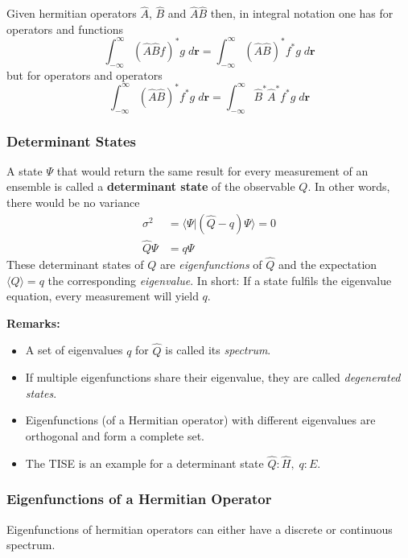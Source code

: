 Given hermitian operators $\hat{A}$, $\hat{B}$ and $\hat{A}\hat{B}$ then, in integral notation one has for operators and functions
\begin{equation*}
    \int_{-\infty}^{\infty} {(\hat{A}\hat{B}f)}^* g\; d \mathbf{r}=\int_{-\infty}^{\infty} {(\hat{A}\hat{B})}^*f^* g\; d \mathbf{r}
\end{equation*}
but for operators and operators
\begin{equation*}
    \int_{-\infty}^{\infty} {(\hat{A}\hat{B})}^*f^* g\; d \mathbf{r}=\int_{-\infty}^{\infty} \hat{B}^*\hat{A}^*f^* g\; d \mathbf{r}
\end{equation*}

\subsubsection{Determinant States}
A state $\Psi$ that would return the same result for every measurement of an ensemble is called a \textbf{determinant state} of the observable $Q$.
In other words, there would be no variance
\noindent\begin{align*}
    \sigma^2     & = \langle \Psi|(\hat{Q} - q) \Psi\rangle = 0 \\
    \hat{Q} \Psi & = q \Psi
\end{align*}
These determinant states of $Q$ are \textit{eigenfunctions} of $\hat{Q}$ and the expectation $\langle Q\rangle = q$ the corresponding \textit{eigenvalue}.
\newpar{}
In short: If a state fulfils the eigenvalue equation, every measurement will yield $q$.

\textbf{Remarks:}
\begin{itemize}
    \item A set of eigenvalues $q$ for $\hat{Q}$ is called its \textit{spectrum}.
    \item If multiple eigenfunctions share their eigenvalue, they are called \textit{degenerated states}.
    \item Eigenfunctions (of a Hermitian operator) with different eigenvalues are orthogonal and form a complete set.
    \item The TISE is an example for a determinant state\newline
          $\hat{Q}: \hat{H},\; q:E$.
\end{itemize}

\subsubsection{Eigenfunctions of a Hermitian Operator}
Eigenfunctions of hermitian operators can either have a discrete or continuous spectrum.

